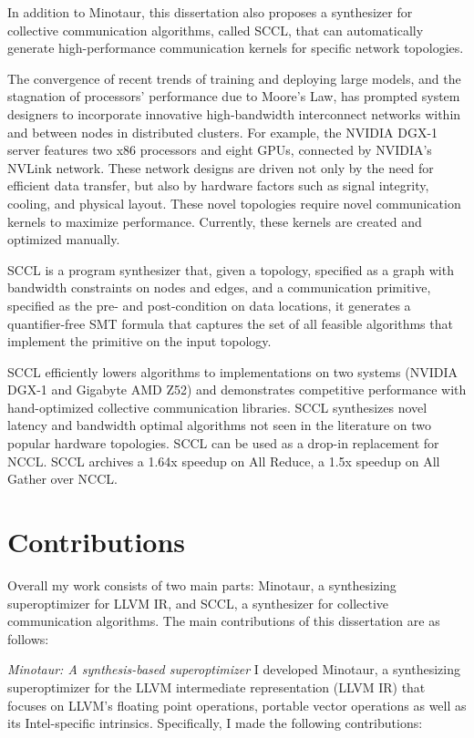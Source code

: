 In addition to Minotaur, this dissertation also proposes a synthesizer
for collective communication algorithms, called SCCL, that can
automatically generate high-performance communication kernels for
specific network topologies.

The convergence of recent trends of training and deploying large
models, and the stagnation of processors' performance due to Moore's
Law, has prompted system designers to incorporate innovative
high-bandwidth interconnect networks within and between nodes in
distributed clusters. For example, the NVIDIA DGX-1 server features
two x86 processors and eight GPUs, connected by NVIDIA's NVLink
network. These network designs are driven not only by the need for
efficient data transfer, but also by hardware factors such as signal
integrity, cooling, and physical layout. These novel topologies
require novel communication kernels to maximize performance.
Currently, these kernels are created and optimized manually.

SCCL is a program synthesizer that, given a topology, specified as a
graph with bandwidth constraints on nodes and edges, and a
communication primitive, specified as the pre- and post-condition on
data locations, it generates a quantifier-free SMT formula that
captures the set of all feasible algorithms that implement the
primitive on the input topology.

SCCL efficiently lowers algorithms to implementations on two systems
(NVIDIA DGX-1 and Gigabyte AMD Z52) and demonstrates competitive
performance with hand-optimized collective communication libraries.
SCCL synthesizes novel latency and bandwidth optimal algorithms not
seen in the literature on two popular hardware topologies.
SCCL can be used as a drop-in replacement for NCCL.
SCCL archives a 1.64x speedup on All Reduce, a 1.5x speedup on All Gather
over NCCL.



\section{Contributions}

Overall my work consists of two main parts: Minotaur, a synthesizing
superoptimizer for LLVM IR, and SCCL, a synthesizer for collective
communication algorithms. The main contributions of this dissertation
are as follows:

\emph{Minotaur: A synthesis-based superoptimizer} I developed
Minotaur, a synthesizing superoptimizer for the LLVM intermediate
representation (LLVM IR) that focuses on LLVM's floating point
operations, portable vector operations as well as its Intel-specific
intrinsics. Specifically, I made the following contributions:

